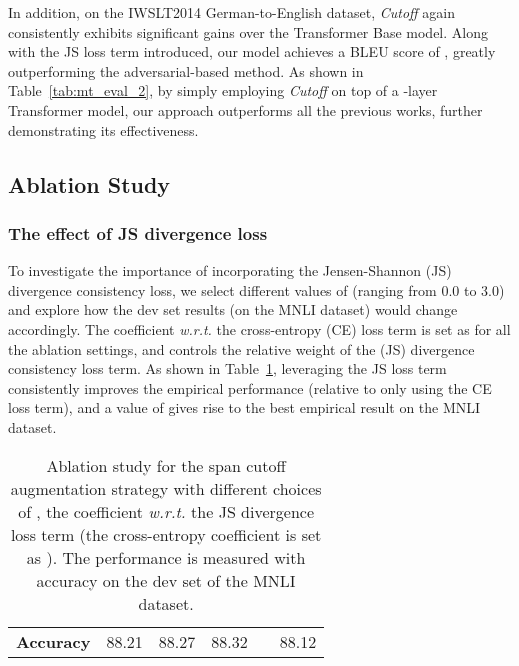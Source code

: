 \documentclass[11pt,a4paper]{article}
\begin{document}
In addition, on the IWSLT2014 German-to-English dataset, \emph{Cutoff} again consistently exhibits significant gains over the Transformer Base model. Along with the JS loss term introduced, our model achieves a BLEU score of , greatly outperforming the adversarial-based method. As shown in Table~\ref{tab:mt_eval_2}, by simply employing \emph{Cutoff} on top of a -layer Transformer model, our approach outperforms all the previous works, further demonstrating its effectiveness.
\vspace{-1mm}
\subsection{Ablation Study}
\vspace{-1mm}
\subsubsection{The effect of JS divergence loss}
To investigate the importance of incorporating the Jensen-Shannon (JS) divergence consistency loss, we select different values of  (ranging from 0.0 to 3.0) and explore how the dev set results (on the MNLI dataset) would change accordingly. The coefficient \emph{w.r.t.} the cross-entropy (CE) loss term is set as  for all the ablation settings, and  controls the relative weight of the (JS) divergence consistency loss term. As shown in Table~\ref{tab:beta}, leveraging the JS loss term consistently improves the empirical performance (relative to only using the CE loss term), and a  value of  gives rise to the best empirical result on the MNLI dataset.
\begin{table} [ht!]
	\centering
\def\arraystretch{1.25}
	\footnotesize 
	\vspace{-1mm}
\begin{tabular}{c||c|c|c|c|c}
\toprule[1.2pt]
	     &  &  &  &  &   \\
		\hline
		\textbf{Accuracy} & 88.21 & 88.27  & 88.32  &   & 88.12  \\
		\bottomrule[1.2pt]
\end{tabular}
	\caption{Ablation study for the span cutoff augmentation strategy with different choices of , the coefficient \emph{w.r.t.} the JS divergence loss term (the cross-entropy coefficient  is set as ). The performance is measured with accuracy on the dev set of the MNLI dataset.}
	\label{tab:beta}
\vspace{-2mm}
\end{table}
\vspace{-2mm}
\end{document}
